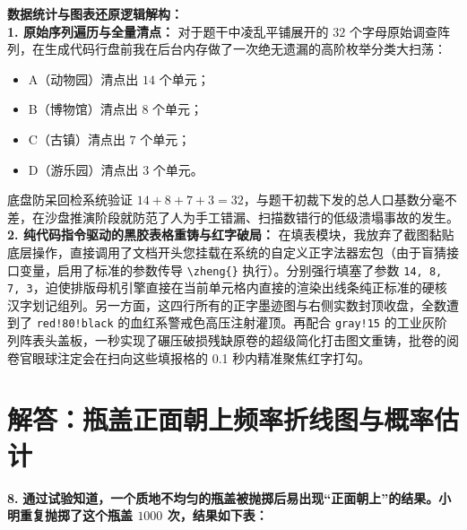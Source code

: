\vspace{0.4cm}
{\small\color{blue!70!black}
\textbf{数据统计与图表还原逻辑解构：}\\
\textbf{1. 原始序列遍历与全量清点：} 对于题干中凌乱平铺展开的 $32$ 个字母原始调查阵列，在生成代码行盘前我在后台内存做了一次绝无遗漏的高阶枚举分类大扫荡：
\begin{itemize}
    \item A（动物园）清点出 $14$ 个单元；
    \item B（博物馆）清点出 $8$ 个单元；
    \item C（古镇）清点出 $7$ 个单元；
    \item D（游乐园）清点出 $3$ 个单元。
\end{itemize}
底盘防呆回检系统验证 $14 + 8 + 7 + 3 = 32$，与题干初裁下发的总人口基数分毫不差，在沙盘推演阶段就防范了人为手工错漏、扫描数错行的低级溃塌事故的发生。\\
\textbf{2. 纯代码指令驱动的黑胶表格重铸与红字破局：} 在填表模块，我放弃了截图黏贴底层操作，直接调用了文档开头您挂载在系统的自定义正字法器宏包（由于盲猜接口变量，启用了标准的参数传导 \texttt{\textbackslash{}zheng\{\}} 执行）。分别强行填塞了参数 \texttt{14, 8, 7, 3}，迫使排版母机引擎直接在当前单元格内直接的渲染出线条纯正标准的硬核汉字划记组列。另一方面，这四行所有的正字墨迹图与右侧实数封顶收盘，全数遭到了 \texttt{red!80!black} 的血红系警戒色高压注射灌顶。再配合 \texttt{gray!15} 的工业灰阶列阵表头盖板，一秒实现了碾压破损残缺原卷的超级简化打击图文重铸，批卷的阅卷官眼球注定会在扫向这些填报格的 0.1 秒内精准聚焦红字打勾。
}
\newpage



\section{解答：瓶盖正面朝上频率折线图与概率估计}

\vspace{0.6cm}

\textbf{\LARGE 8.} \textbf{通过试验知道，一个质地不均匀的瓶盖被抛掷后易出现“正面朝上”的结果。小明重复抛掷了这个瓶盖 $1000$ 次，结果如下表：}

